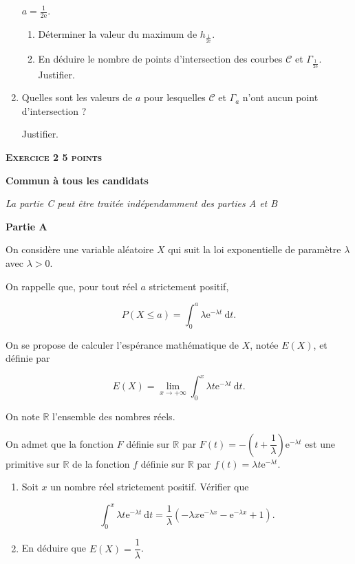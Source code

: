 \documentclass[10pt]{article}
\newcommand{\R}{\mathbb{R}}
\begin{document}
\begin{enumerate}
$a = \frac{1}{2\text{e}}$.
	\begin{enumerate}
		\item Déterminer la valeur du maximum de $h_{\frac{1}{2\text{e}}}$.
		\item En déduire le nombre de points d'intersection des courbes $\mathcal{C}$ et $\Gamma_{\frac{1}{2\text{e}}}$. Justifier.
	\end{enumerate}
\item Quelles sont les valeurs de $a$ pour lesquelles $\mathcal{C}$ et $\Gamma_{a}$ n'ont aucun point d'intersection ?
	
Justifier.
\end{enumerate}

\vspace{0,5cm}

\textbf{\textsc{Exercice 2 \hfill 5 points}}

\textbf{Commun à tous les candidats} 

\medskip

\emph{La partie C peut être traitée indépendamment des parties A et B}

\bigskip

\textbf{Partie A}

\medskip

On considère une variable aléatoire $X$ qui suit la loi exponentielle de paramètre $\lambda$ avec $\lambda > 0$.

On rappelle que, pour tout réel $a$ strictement positif,

\[P(X \leqslant  a) = \displaystyle\int_0^a \lambda\text{e}^{- \lambda t}\:\text{d}t.\]

On se propose de calculer l'espérance mathématique de $X$, notée $E(X)$, et définie par

\[E(X) = \displaystyle\lim_{x \to + \infty} \int_0^x \lambda t \text{e}^{- \lambda t}\:\text{d}t.\]

On note $\R$ l'ensemble des nombres réels.

On admet que la fonction $F$ définie sur $\R$ par $F(t) = - \left(t + \dfrac{1}{\lambda}\right)\text{e}^{- \lambda t}$ est une primitive sur $\R$ de la fonction $f$ définie sur $\R$ par $f(t) = \lambda t \text{e}^{- \lambda t}$.

\medskip

\begin{enumerate}
\item Soit $x$ un nombre réel strictement positif. Vérifier que

\[\displaystyle \int_0^x \lambda t \text{e}^{- \lambda t}\:\text{d}t = \dfrac{1}{\lambda}\left(- \lambda x \text{e}^{- \lambda x} -  \text{e}^{- \lambda x} + 1\right).\]

\item  En déduire que $E(X) = \dfrac{1}{\lambda}$.
\end{enumerate}
\end{document}
